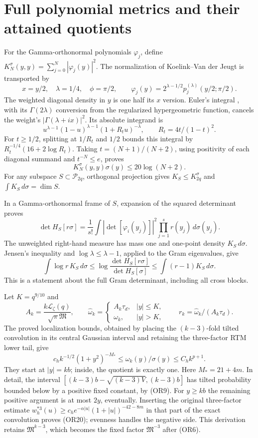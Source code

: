 \documentclass[11pt]{article}
\newcommand{\PP}{\mathcal P}
\newcommand{\MM}{\mathfrak M}
\begin{document}
\section{Full polynomial metrics and their attained quotients}
For the Gamma-orthonormal polynomials \(\varphi_j\), define
\(K_N^\sigma(y,y)=\sum_{j=0}^N|\varphi_j(y)|^2\).
The normalization of Koelink--Van der Jeugt
\cite[Proposition 2.1, (2.9)]{KVJ} is transported by
\[
 x=y/2,\quad\lambda=1/4,\quad\phi=\pi/2,\qquad
 \varphi_j(y)=2^{\lambda-1/2}p_j^{(\lambda)}(y/2;\pi/2).
\]
The weighted diagonal density in \(y\) is one half its \(x\) version.
Euler's integral \cite[(15.6.1)]{DLMFhyper}, with its
\(\Gamma(2\lambda)\) conversion from the regularized
hypergeometric function, cancels the weight's
\(|\Gamma(\lambda+ix)|^2\).  Its absolute integrand is
\[
 u^{\lambda-1}(1-u)^{\lambda-1}(1+R_tu)^{-\lambda},
 \qquad R_t=4t/(1-t)^2 .
 \]
For \(t\geq1/2\), splitting at \(1/R_t\) and \(1/2\) bounds this
integral by \(R_t^{-1/4}(16+2\log R_t)\).
Taking \(t=(N+1)/(N+2)\), using positivity of each diagonal
summand and \(t^{-N}\leq e\), proves
\[
 K_N^\sigma(y,y)\sigma(y)\leq20\log(N+2).              \tag{OR17}
\]
For any subspace \(S\subset\PP_{2q}\), orthogonal projection gives
\(K_S\leq K_{2q}^\sigma\) and \(\int K_S\,d\sigma=\dim S\).

In a Gamma-orthonormal frame of \(S\), expansion of the squared
determinant proves
\[
 \det H_S[r\sigma]
 =\frac1{s!}\int|\det[\varphi_i(y_j)]|^2
              \prod_{j=1}^s r(y_j)\,d\sigma(y_j).
 \]
The unweighted right-hand measure has mass one and one-point
density \(K_S\,d\sigma\).  Jensen's inequality and
\(\log\lambda\leq\lambda-1\), applied to the Gram eigenvalues, give
\[
 \int\log r\,K_S\,d\sigma
 \leq\log\frac{\det H_S[r\sigma]}{\det H_S[\sigma]}
 \leq\int(r-1)K_S\,d\sigma.                          \tag{OR18}
\]
This is a statement about the full Gram determinant, including all
cross blocks.

Let \(K=q^{9/10}\) and
\[
 A_k=\frac{k\mathcal L_\zeta(q)}{\sqrt\pi\MM},\qquad
 \widehat\omega_k=
 \begin{cases}A_k\tau_d,&|y|\leq K,\\
 \omega_k,&|y|>K,\end{cases}\qquad
 r_k=\widehat\omega_k/(A_k\tau_d).                    \tag{OR19}
\]
The proved localization bounds, obtained by placing the
\((k-3)\)-fold tilted convolution in its central Gaussian interval
and retaining the three-factor RTM lower tail, give
\[
 c_h k^{-1/2}(1+y^2)^{-M_*}
 \leq\omega_k(y)/\sigma(y)\leq C_hk^{p+1}.            \tag{OR20}
\]
They start at \(|y|=kb\); inside, the quotient is exactly one.
Here \(M_*=21+4m\).  In detail, the interval
\([(k-3)b-\sqrt{(k-3)V},(k-3)b]\) has tilted probability bounded
below by a positive fixed constant, by (OR9).  For \(y\geq kb\)
the remaining positive argument is at most \(2y\), eventually.
Inserting the original three-factor estimate
\(w_h^{*3}(u)\geq c_he^{-\alpha|u|}(1+|u|)^{-42-8m}\)
in that part of the exact convolution proves (OR20); evenness
handles the negative side.  This derivation retains \(\MM^{k-3}\),
which becomes the fixed factor \(\MM^{-3}\) after (OR6).
\end{document}
